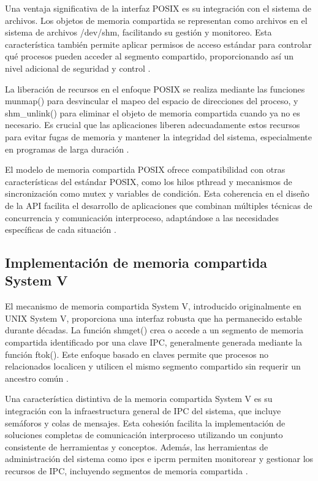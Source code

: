 {Una ventaja significativa de la interfaz POSIX es su integración con el sistema de archivos. Los objetos de memoria compartida se representan como archivos en el sistema de archivos /dev/shm, facilitando su gestión y monitoreo. Esta característica también permite aplicar permisos de acceso estándar para controlar qué procesos pueden acceder al segmento compartido, proporcionando así un nivel adicional de seguridad y control \cite{love2013linux}.
\vspace{10pt}

La liberación de recursos en el enfoque POSIX se realiza mediante las funciones munmap() para desvincular el mapeo del espacio de direcciones del proceso, y shm\_unlink() para eliminar el objeto de memoria compartida cuando ya no es necesario. Es crucial que las aplicaciones liberen adecuadamente estos recursos para evitar fugas de memoria y mantener la integridad del sistema, especialmente en programas de larga duración \cite{kerrisk2010linux}.
\vspace{10pt}

El modelo de memoria compartida POSIX ofrece compatibilidad con otras características del estándar POSIX, como los hilos pthread y mecanismos de sincronización como mutex y variables de condición. Esta coherencia en el diseño de la API facilita el desarrollo de aplicaciones que combinan múltiples técnicas de concurrencia y comunicación interproceso, adaptándose a las necesidades específicas de cada situación \cite{butenhof1997programming}.

\subsection{Implementación de memoria compartida System V}

El mecanismo de memoria compartida System V, introducido originalmente en UNIX System V, proporciona una interfaz robusta que ha permanecido estable durante décadas. La función shmget() crea o accede a un segmento de memoria compartida identificado por una clave IPC, generalmente generada mediante la función ftok(). Este enfoque basado en claves permite que procesos no relacionados localicen y utilicen el mismo segmento compartido sin requerir un ancestro común \cite{stevens2013advanced}.
\vspace{10pt}

Una característica distintiva de la memoria compartida System V es su integración con la infraestructura general de IPC del sistema, que incluye semáforos y colas de mensajes. Esta cohesión facilita la implementación de soluciones completas de comunicación interproceso utilizando un conjunto consistente de herramientas y conceptos. Además, las herramientas de administración del sistema como ipcs e ipcrm permiten monitorear y gestionar los recursos de IPC, incluyendo segmentos de memoria compartida \cite{robbins2003unix}.
\vspace{10pt}

}
